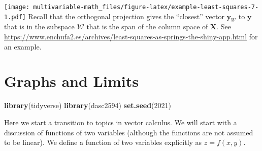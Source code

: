 \documentclass[
]{book}
\newenvironment{Shaded}{\begin{snugshade}}{\end{snugshade}}
\newcommand{\CommentTok}[1]{\textcolor[rgb]{0.56,0.35,0.01}{\textit{#1}}}
\newcommand{\DataTypeTok}[1]{\textcolor[rgb]{0.13,0.29,0.53}{#1}}
\newcommand{\DecValTok}[1]{\textcolor[rgb]{0.00,0.00,0.81}{#1}}
\newcommand{\KeywordTok}[1]{\textcolor[rgb]{0.13,0.29,0.53}{\textbf{#1}}}
\newcommand{\NormalTok}[1]{#1}
\newcommand{\OperatorTok}[1]{\textcolor[rgb]{0.81,0.36,0.00}{\textbf{#1}}}
\newcommand{\StringTok}[1]{\textcolor[rgb]{0.31,0.60,0.02}{#1}}
\theoremstyle{definition}
\theoremstyle{definition}
\theoremstyle{definition}
\theoremstyle{definition}
\theoremstyle{remark}
\begin{document}
\begin{Shaded}
\end{Shaded}

\texttt{[image: multivariable-math\_files/figure-latex/example-least-squares-7-1.pdf]}
Recall that the orthogonal projection gives the ``closest'' vector \(\mathbf{y}_W\) to \(\mathbf{y}\) that is in the subspace \(\mathcal{W}\) that is the span of the column space of \(\mathbf{X}\). See \url{https://www.enchufa2.es/archives/least-squares-as-springs-the-shiny-app.html} for an example.

\hypertarget{graphs-and-limits}{%
\chapter{Graphs and Limits}\label{graphs-and-limits}}

\begin{Shaded}
\begin{Highlighting}[]
\KeywordTok{library}\NormalTok{(tidyverse)}
\KeywordTok{library}\NormalTok{(dasc2594)}
\KeywordTok{set.seed}\NormalTok{(}\DecValTok{2021}\NormalTok{)}
\end{Highlighting}
\end{Shaded}

Here we start a transition to topics in vector calculus. We will start with a discussion of functions of two variables (although the functions are not assumed to be linear). We define a function of two variables explicitly as \(z = f(x, y)\).
\end{document}

